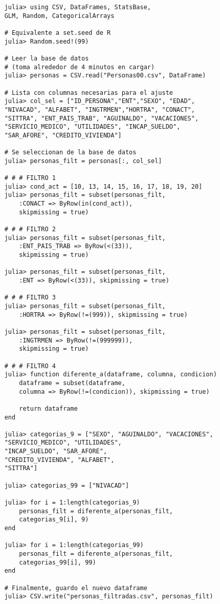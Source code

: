 \begin{verbatim}
	julia> using CSV, DataFrames, StatsBase, 
	GLM, Random, CategoricalArrays

	# Equivalente a set.seed de R
	julia> Random.seed!(99)

	# Leer la base de datos 
	# (toma alrededor de 4 minutos en cargar)
	julia> personas = CSV.read("Personas00.csv", DataFrame)

	# Lista con columnas necesarias para el ajuste
	julia> col_sel = ["ID_PERSONA","ENT","SEXO", "EDAD", 
	"NIVACAD", "ALFABET", "INGTRMEN","HORTRA", "CONACT", 
	"SITTRA", "ENT_PAIS_TRAB", "AGUINALDO", "VACACIONES", 
	"SERVICIO_MEDICO", "UTILIDADES", "INCAP_SUELDO", 
	"SAR_AFORE", "CREDITO_VIVIENDA"]
         
	# Se seleccionan de la base de datos 
	julia> personas_filt = personas[:, col_sel]    

	# # # FILTRO 1
	julia> cond_act = [10, 13, 14, 15, 16, 17, 18, 19, 20]
	julia> personas_filt = subset(personas_filt, 
		:CONACT => ByRow(in(cond_act)), 
		skipmissing = true)

	# # # FILTRO 2
	julia> personas_filt = subset(personas_filt, 
		:ENT_PAIS_TRAB => ByRow(<(33)), 
		skipmissing = true)

	julia> personas_filt = subset(personas_filt, 
		:ENT => ByRow(<(33)), skipmissing = true)

	# # # FILTRO 3
	julia> personas_filt = subset(personas_filt, 
		:HORTRA => ByRow(!=(999)), skipmissing = true)

	julia> personas_filt = subset(personas_filt, 
		:INGTRMEN => ByRow(!=(999999)), 
		skipmissing = true)

	# # # FILTRO 4
	julia> function diferente_a(dataframe, columna, condicion)
    	dataframe = subset(dataframe, 
    	columna => ByRow(!=(condicion)), skipmissing = true)
    
    	return dataframe
	end

	julia> categorias_9 = ["SEXO", "AGUINALDO", "VACACIONES", 
	"SERVICIO_MEDICO", "UTILIDADES",
	"INCAP_SUELDO", "SAR_AFORE",
	"CREDITO_VIVIENDA", "ALFABET", 
	"SITTRA"]

	julia> categorias_99 = ["NIVACAD"]

	julia> for i = 1:length(categorias_9)
    	personas_filt = diferente_a(personas_filt, 
    	categorias_9[i], 9)
	end

	julia> for i = 1:length(categorias_99)
    	personas_filt = diferente_a(personas_filt, 
    	categorias_99[i], 99)
	end

	# Finalmente, guardo el nuevo dataframe
	julia> CSV.write("personas_filtradas.csv", personas_filt)
\end{verbatim}


